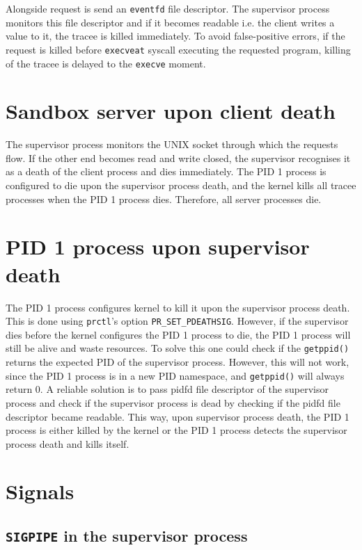 \documentclass[en]{pracamgr}
\begin{document}
Alongside request is send an \texttt{eventfd} file descriptor. The supervisor process monitors this file descriptor and if it becomes readable i.e. the client writes a value to it, the tracee is killed immediately. To avoid false-positive errors, if the request is killed before \texttt{execveat} syscall executing the requested program, killing of the tracee is delayed to the \texttt{execve} moment.

\section{Sandbox server upon client death}

The supervisor process monitors the UNIX socket through which the requests flow. If the other end becomes read and write closed, the supervisor recognises it as a death of the client process and dies immediately. The PID 1 process is configured to die upon the supervisor process death, and the kernel kills all tracee processes when the PID 1 process dies. Therefore, all server processes die.

\section{PID 1 process upon supervisor death}

The PID 1 process configures kernel to kill it upon the supervisor process death. This is done using \texttt{prctl}'s option \texttt{PR\_SET\_PDEATHSIG}. However, if the supervisor dies before the kernel configures the PID 1 process to die, the PID 1 process will still be alive and waste resources. To solve this one could check if the \texttt{getppid()} returns the expected PID of the supervisor process. However, this will not work, since the PID 1 process is in a new PID namespace, and \texttt{getppid()} will always return 0. A reliable solution is to pass pidfd file descriptor of the supervisor process and check if the supervisor process is dead by checking if the pidfd file descriptor became readable. This way, upon supervisor process death, the PID 1 process is either killed by the kernel or the PID 1 process detects the supervisor process death and kills itself.

\section{Signals}

\subsection{\texttt{SIGPIPE} in the supervisor process}
\end{document}
